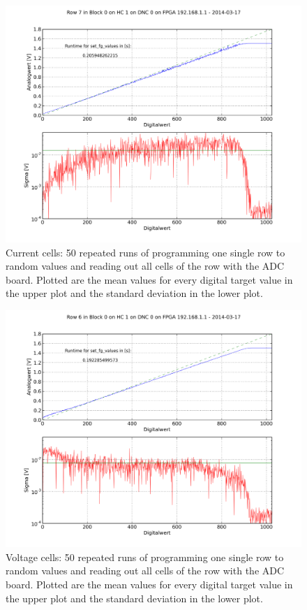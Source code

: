 \documentclass[a4paper,twocolumn,draft=true]{scrartcl}
\begin{document}
\begin{figure}
\includegraphics[scale=.28]{figures/single_row_random_progonerow_default_current.png}
\caption{Current cells: 50 repeated runs of programming one single row to random values and reading out all cells of the row with the ADC board. Plotted are the mean values for every digital target value in the upper plot and the standard deviation in the lower plot.}
\label{fig:row_progrow_default_current}
\end{figure}

\begin{figure}
\includegraphics[scale=.28]{figures/single_row_random_progonerow_default_voltage.png}
\caption{Voltage cells: 50 repeated runs of programming one single row to random values and reading out all cells of the row with the ADC board. Plotted are the mean values for every digital target value in the upper plot and the standard deviation in the lower plot.}
\label{fig:row_progrow_default_voltage}
\end{figure}
\end{document}
